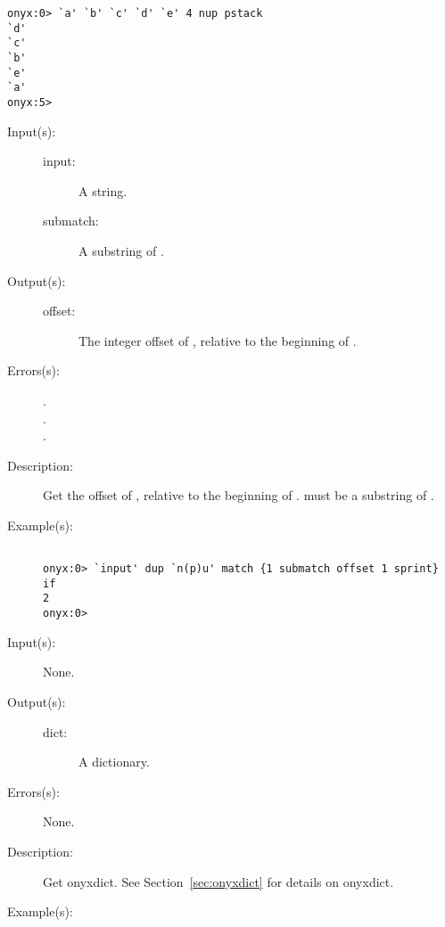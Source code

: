 \begin{description}
\begin{description}
\begin{verbatim}
onyx:0> `a' `b' `c' `d' `e' 4 nup pstack
`d'
`c'
`b'
`e'
`a'
onyx:5>
		\end{verbatim}
	\end{description}
\label{systemdict:offset}
\item[{\onyxop{input submatch}{offset}{offset}}: ]
	\begin{description}\item[]
	\item[Input(s): ]
		\begin{description}\item[]
		\item[input: ]
			A string.
		\item[submatch: ]
			A substring of .
		\end{description}
	\item[Output(s): ]
		\begin{description}\item[]
		\item[offset: ]
			The integer offset of , relative to the
			beginning of .
		\end{description}
	\item[Errors(s): ]
		\begin{description}\item[]
		\item[.]
		\item[.]
		\item[.]
		\end{description}
	\item[Description: ]
		Get the offset of , relative to the beginning of
		.   must be a substring of
		.
	\item[Example(s): ]\begin{verbatim}

onyx:0> `input' dup `n(p)u' match {1 submatch offset 1 sprint} if
2
onyx:0>
		\end{verbatim}
	\end{description}
\label{systemdict:onyxdict}
\item[{\onyxop{--}{onyxdict}{dict}}: ]
	\begin{description}\item[]
	\item[Input(s): ] None.
	\item[Output(s): ]
		\begin{description}\item[]
		\item[dict: ]
			A dictionary.
		\end{description}
	\item[Errors(s): ] None.
	\item[Description: ]
		Get onyxdict.  See Section~\ref{sec:onyxdict} for details on
		onyxdict.
	\item[Example(s): ]\begin{verbatim}


\end{verbatim}
\end{description}
\end{description}
